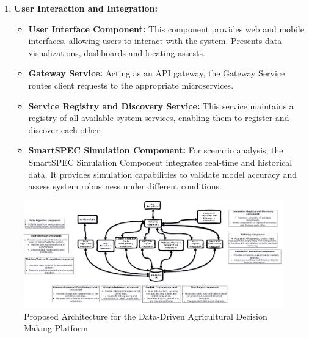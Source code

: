 \documentclass[11pt]{article}
\begin{document}
\begin{enumerate}[label=\arabic*., wide=0pt, left=0pt]
    \item \textbf{User Interaction and Integration:}
    \begin{itemize}
        \item \textbf{User Interface Component:} This component provides web and mobile interfaces, allowing users to interact with the system. Presents data visualizations, dashboards and locating assests.
        \item \textbf{Gateway Service:} Acting as an API gateway, the Gateway Service routes client requests to the appropriate microservices.
        \item \textbf{Service Registry and Discovery Service:} This service maintains a registry of all available system services, enabling them to register and discover each other.
        \item \textbf{SmartSPEC Simulation Component:} For scenario analysis, the SmartSPEC Simulation Component integrates real-time and historical data. It provides simulation capabilities to validate model accuracy and assess system robustness under different conditions.
    \end{itemize}
\end{enumerate}
\begin{figure}[h!]
    \centering
    \includegraphics[width=\textwidth]{archite.png}
    \caption{Proposed Architecture for the Data-Driven Agricultural Decision Making Platform}
    \label{fig:architecture}
\end{figure}
\end{document}
